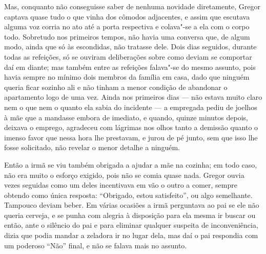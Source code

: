 Mas, conquanto não conseguisse saber de nenhuma novidade diretamente,
Gregor captava quase tudo o que vinha dos cômodos adjacentes, e assim que
escutava alguma voz corria no ato até a porta respectiva e colava"-se a ela
com o corpo todo. Sobretudo nos primeiros tempos, não havia uma conversa
que, de algum modo, ainda que só às escondidas, não tratasse dele. Dois
dias seguidos, durante todas as refeições, só se ouviram deliberações
sobre como deviam se comportar daí em diante; mas também entre as
refeições falava"-se do mesmo assunto, pois havia sempre no mínimo dois
membros da família em casa, dado que ninguém queria ficar sozinho ali e
não tinham a menor condição de abandonar o apartamento logo de uma vez.
Ainda nos primeiros dias --- não estava muito claro nem o que nem o quanto
ela sabia do incidente --- a empregada pediu de joelhos à mãe que a mandasse
embora de imediato, e quando, quinze minutos depois, deixava o emprego,
agradeceu com lágrimas nos olhos tanto a demissão quanto o imenso favor
que nessa hora lhe prestavam, e jurou de pé junto, sem que isso lhe fosse
solicitado, não revelar o menor detalhe a ninguém.

Então a irmã se viu também obrigada a ajudar a mãe na cozinha; em todo
caso, não era muito o esforço exigido, pois não se comia quase nada.
Gregor ouvia vezes seguidas como um deles incentivava em vão o outro a
comer, sempre obtendo como única resposta: “Obrigado, estou satisfeito”,
ou algo semelhante. Tampouco deviam beber. Em várias ocasiões a irmã
perguntava ao pai se ele não queria cerveja, e se punha com alegria à
disposição para ela mesma ir buscar ou então, ante o silêncio do pai e
para eliminar qualquer suspeita de inconveniência, dizia que podia mandar
a zeladora ir no lugar dela, mas daí o pai respondia com um poderoso “Não”
final, e não se falava mais no assunto.

